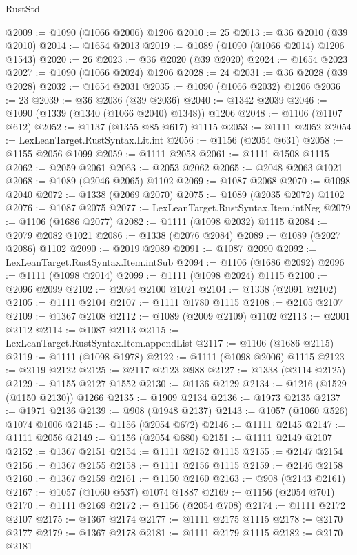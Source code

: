 \begin{lexlean}{RustStd}
\begin{coremodule}
@2009 := @1090 (@1066 @2006) @1206
@2010 := 25
@2013 := @36 @2010 (@39 @2010)
@2014 := @1654 @2013
@2019 := @1089 (@1090 (@1066 @2014) @1206 @1543)
@2020 := 26
@2023 := @36 @2020 (@39 @2020)
@2024 := @1654 @2023
@2027 := @1090 (@1066 @2024) @1206
@2028 := 24
@2031 := @36 @2028 (@39 @2028)
@2032 := @1654 @2031
@2035 := @1090 (@1066 @2032) @1206
@2036 := 23
@2039 := @36 @2036 (@39 @2036)
@2040 := @1342 @2039
@2046 := @1090 (@1339 (@1340 (@1066 @2040) @1348)) @1206
@2048 := @1106 (@1107 @612)
@2052 := @1137 (@1355 @85 @617) @1115
@2053 := @1111 @2052
@2054 := LexLeanTarget.RustSyntax.Lit.int
@2056 := @1156 (@2054 @631)
@2058 := @1155 @2056 @1099
@2059 := @1111 @2058
@2061 := @1111 @1508 @1115
@2062 := @2059 @2061
@2063 := @2053 @2062
@2065 := @2048 @2063 @1021
@2068 := @1089 (@2046 @2065) @1102
@2069 := @1087 @2068
@2070 := @1098 @2040
@2072 := @1338 (@2069 @2070)
@2075 := @1089 (@2035 @2072) @1102
@2076 := @1087 @2075
@2077 := LexLeanTarget.RustSyntax.Item.intNeg
@2079 := @1106 (@1686 @2077)
@2082 := @1111 (@1098 @2032) @1115
@2084 := @2079 @2082 @1021
@2086 := @1338 (@2076 @2084)
@2089 := @1089 (@2027 @2086) @1102
@2090 := @2019 @2089
@2091 := @1087 @2090
@2092 := LexLeanTarget.RustSyntax.Item.intSub
@2094 := @1106 (@1686 @2092)
@2096 := @1111 (@1098 @2014)
@2099 := @1111 (@1098 @2024) @1115
@2100 := @2096 @2099
@2102 := @2094 @2100 @1021
@2104 := @1338 (@2091 @2102)
@2105 := @1111 @2104
@2107 := @1111 @1780 @1115
@2108 := @2105 @2107
@2109 := @1367 @2108
@2112 := @1089 (@2009 @2109) @1102
@2113 := @2001 @2112
@2114 := @1087 @2113
@2115 := LexLeanTarget.RustSyntax.Item.appendList
@2117 := @1106 (@1686 @2115)
@2119 := @1111 (@1098 @1978)
@2122 := @1111 (@1098 @2006) @1115
@2123 := @2119 @2122
@2125 := @2117 @2123 @988
@2127 := @1338 (@2114 @2125)
@2129 := @1155 @2127 @1552
@2130 := @1136 @2129
@2134 := @1216 (@1529 (@1150 @2130)) @1266
@2135 := @1909 @2134
@2136 := @1973 @2135
@2137 := @1971 @2136
@2139 := @908 (@1948 @2137)
@2143 := @1057 (@1060 @526) @1074 @1006
@2145 := @1156 (@2054 @672)
@2146 := @1111 @2145
@2147 := @1111 @2056
@2149 := @1156 (@2054 @680)
@2151 := @1111 @2149 @2107
@2152 := @1367 @2151
@2154 := @1111 @2152 @1115
@2155 := @2147 @2154
@2156 := @1367 @2155
@2158 := @1111 @2156 @1115
@2159 := @2146 @2158
@2160 := @1367 @2159
@2161 := @1150 @2160
@2163 := @908 (@2143 @2161)
@2167 := @1057 (@1060 @537) @1074 @1887
@2169 := @1156 (@2054 @701)
@2170 := @1111 @2169
@2172 := @1156 (@2054 @708)
@2174 := @1111 @2172 @2107
@2175 := @1367 @2174
@2177 := @1111 @2175 @1115
@2178 := @2170 @2177
@2179 := @1367 @2178
@2181 := @1111 @2179 @1115
@2182 := @2170 @2181

\end{coremodule}
\end{lexlean}

